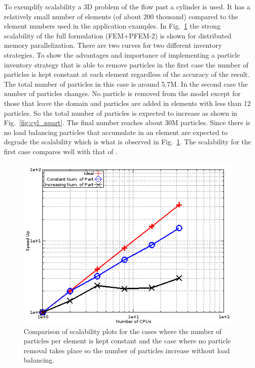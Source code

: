 To exemplify scalability a 3D problem of the flow past a cylinder is used. It has a relatively small number of elements (of about 200 thousand) compared to the element numbers used in the application examples. 
In Fig.~\ref{fig:scalab} the strong scalability of the full formulation (FEM+PFEM-2) is shown for distributed memory parallelization. There are two curves for two different inventory strategies. To show the advantages and importance of implementing a particle inventory strategy that is able to remove particles in the first case the number of particles is kept constant at each element regardless of the accuracy of the result. The total number of particles in this case is around 5.7M. In the second case the number of particles changes. No particle is removed from the model except for those that leave the domain and particles are added in elements with less than 12 particles. So the total number of particles is expected to increase as shown in Fig.~\ref{fig:cyl_npart}. The final number reaches about 30M particles. Since there is no load balancing particles that accumulate in an element are expected to degrade the scalability which is what is observed in Fig.~\ref{fig:scalab}. The scalability for the first case compares well with that of \cite{gimenez:parallel}.
%
\begin{figure}[htp] 
\centering 
\includegraphics[scale=.6]{./imgs/scalability1.png}
\caption{Comparison of scalability plots for the cases where the number of particles per element is kept constant and the case where no particle removal takes place so the number of particles increase without load balancing.}
\label{fig:scalab}
\end{figure}

